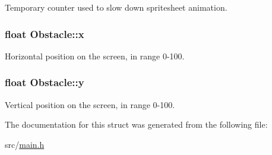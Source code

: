 \-Temporary counter used to slow down spritesheet animation. \hypertarget{structObstacle_ad9cd25e0032f6692a4f93a057ccdfd85}{
\subsubsection[{x}]{\setlength{\rightskip}{0pt plus 5cm}float {\bf \-Obstacle\-::x}}}\label{structObstacle_ad9cd25e0032f6692a4f93a057ccdfd85}
\-Horizontal position on the screen, in range 0-\/100. \hypertarget{structObstacle_af4b6f012014e2fa5aef193330f70fdef}{
\subsubsection[{y}]{\setlength{\rightskip}{0pt plus 5cm}float {\bf \-Obstacle\-::y}}}\label{structObstacle_af4b6f012014e2fa5aef193330f70fdef}
\-Vertical position on the screen, in range 0-\/100. 

\-The documentation for this struct was generated from the following file\-:\begin{DoxyCompactItemize}
\item 
src/\hyperlink{main_8h}{main.\-h}\end{DoxyCompactItemize}
